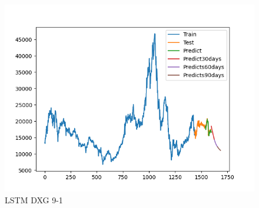 \documentclass[conference]{IEEEtran}
\begin{document}
\begin{figure}[htbp]
\begin{minipage}{0.23\textwidth}
    \includegraphics[width=1\textwidth]{experiment/ltsm/Team4_LSTM_DXG_9_1.png}
    \caption{LSTM DXG 9-1}
    \label{fig:nvl_histogram}
    \end{minipage}


\end{figure}
\end{document}
